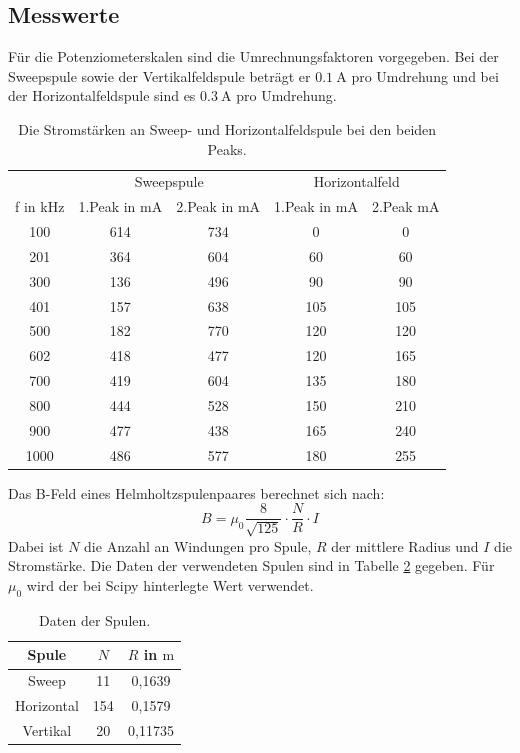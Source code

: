 \documentclass[
  bibliography=totoc,     %
  captions=tableheading,  %
  titlepage=firstiscover, %
]{scrartcl}
\begin{document}
\subsection{Messwerte}
Für die Potenziometerskalen sind die Umrechnungsfaktoren vorgegeben.
Bei der Sweepspule sowie der Vertikalfeldspule beträgt er $\SI{0.1}{\ampere}$ pro Umdrehung und bei
der Horizontalfeldspule sind es $\SI{0.3}{\ampere}$ pro Umdrehung.
\begin{table}[H]
  \centering
  \caption{Die Stromstärken an Sweep- und Horizontalfeldspule bei den beiden Peaks.}
  \label{tab:1}
  \begin{tabular}{c c c c c}
    \toprule
    & \multicolumn{2}{c}{Sweepspule} & \multicolumn{2}{c}{Horizontalfeld}\\
    f in \si{\kilo\hertz} & 1.Peak in $\si{\milli\ampere}$ & 2.Peak in $\si{\milli\ampere}$ & 1.Peak in $\si{\milli\ampere}$ & 2.Peak $\si{\milli\ampere}$ \\
    \midrule
    100  & 614 & 734 &   0 &   0 \\
    201  & 364 & 604 &  60 &  60 \\
    300  & 136 & 496 &  90 &  90 \\
    401  & 157 & 638 & 105 & 105 \\
    500  & 182 & 770 & 120 & 120 \\
    602  & 418 & 477 & 120 & 165 \\
    700  & 419 & 604 & 135 & 180 \\
    800  & 444 & 528 & 150 & 210 \\
    900  & 477 & 438 & 165 & 240 \\
    1000 & 486 & 577 & 180 & 255 \\
    \bottomrule
  \end{tabular}
\end{table}
Das B-Feld eines Helmholtzspulenpaares berechnet sich nach:
\begin{equation}
  B = \mu_0 \frac{8}{\sqrt{125}}\cdot \frac{N}{R} \cdot I
\end{equation}
Dabei ist $N$ die Anzahl an Windungen pro Spule, $R$ der mittlere Radius
und $I$ die Stromstärke. Die Daten der verwendeten Spulen sind in Tabelle \ref{tab:2}
gegeben. Für $\mu_0$ wird der bei Scipy \cite{scipy} hinterlegte Wert verwendet.
\begin{table}[H]
  \centering
  \caption{Daten der Spulen.}
  \label{tab:2}
  \begin{tabular}{c c c}
    \toprule
    Spule & $N$ & $R$ in $\si{\meter}$ \\
    \midrule
    Sweep       &  11 & 0,1639 \\
    Horizontal  & 154 & 0,1579 \\
    Vertikal    &  20 & 0,11735 \\
    \bottomrule
  \end{tabular}
\end{table}
\end{document}
